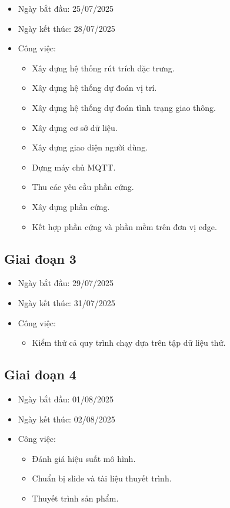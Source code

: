 \begin{itemize}
    \item Ngày bắt đầu: 25/07/2025
    \item Ngày kết thúc: 28/07/2025
    \item Công việc:
    \begin{itemize}
        \item Xây dựng hệ thống rút trích đặc trưng.
        \item Xây dựng hệ thống dự đoán vị trí.
        \item Xây dựng hệ thống dự đoán tình trạng giao thông.
        \item Xây dựng cơ sở dữ liệu.
        \item Xây dựng giao diện người dùng.
        \item Dựng máy chủ MQTT.
        \item Thu các yêu cầu phần cứng.
        \item Xây dựng phần cứng.
        \item Kết hợp phần cứng và phần mềm trên đơn vị edge.
    \end{itemize}
\end{itemize}


\subsection{Giai đoạn 3}
\begin{itemize}
    \item Ngày bắt đầu: 29/07/2025
    \item Ngày kết thúc: 31/07/2025
    \item Công việc:
    \begin{itemize}
        \item Kiểm thử cả quy trình chạy dựa trên tập dữ liệu thử.
    \end{itemize}
\end{itemize}

\subsection{Giai đoạn 4}
\begin{itemize}
    \item Ngày bắt đầu: 01/08/2025
    \item Ngày kết thúc: 02/08/2025
    \item Công việc:
    \begin{itemize}
        \item Đánh giá hiệu suất mô hình.
        \item Chuẩn bị slide và tài liệu thuyết trình.
        \item Thuyết trình sản phẩm.
    \end{itemize}
\end{itemize}












